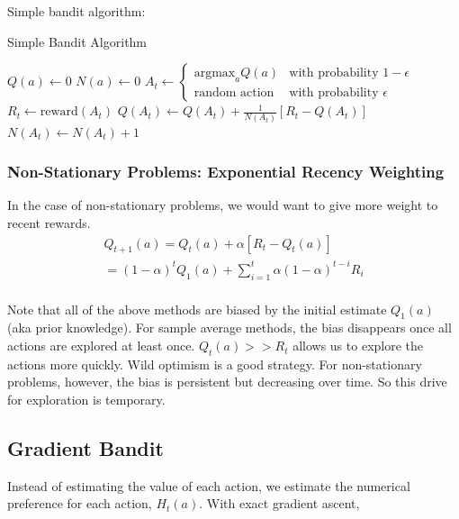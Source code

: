 Simple bandit algorithm:
\begin{algorithm}
    \caption{Simple Bandit Algorithm}
    \begin{algorithmic}
        \State $Q(a) \leftarrow 0$
        \State $N(a) \leftarrow 0$
            \State $A_t \leftarrow \begin{cases}
                \text{argmax}_a Q(a) & \text{with probability } 1 - \epsilon \\
                \text{random action} & \text{with probability } \epsilon
            \end{cases}$
            \State $R_t \leftarrow \text{reward}(A_t)$
            \State $Q(A_t) \leftarrow Q(A_t) + \frac{1}{N(A_t)} [R_t - Q(A_t)] $
            \State $N(A_t) \leftarrow N(A_t) + 1$
        \EndFor
    \end{algorithmic}
\end{algorithm}

\subsubsection{Non-Stationary Problems: Exponential Recency Weighting}

In the case of non-stationary problems, we would want to give more weight to recent rewards.
\begin{equation}
    \begin{split}
        Q_{t+1}(a) = Q_t(a) + \alpha [R_t - Q_t(a)] \\
        = (1 - \alpha)^t Q_1(a) + \sum_{i=1}^{t} \alpha (1 - \alpha)^{t-i} R_i \\
        \label{eq:non-stationary-implementation}
    \end{split}
\end{equation}

Note that all of the above methods are biased by the initial estimate $Q_1(a)$ (aka prior knowledge).
For sample average methods, the bias disappears once all actions are explored at least once. 
$Q_t(a) >> R_t$ allows us to explore the actions more quickly. Wild optimism is a good strategy.
For non-stationary problems, however, the bias is persistent but decreasing over time. So this drive for exploration is temporary.


\subsection{Gradient Bandit}
Instead of estimating the value of each action, we estimate the numerical preference for each action, $H_t(a)$.
With exact gradient ascent,

